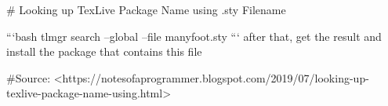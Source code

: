 # Looking up TexLive Package Name using .sty Filename

```bash
tlmgr search --global --file  manyfoot.sty
```
after that, get the result and install the package that contains this file


#Source:
<https://notesofaprogrammer.blogspot.com/2019/07/looking-up-texlive-package-name-using.html>
